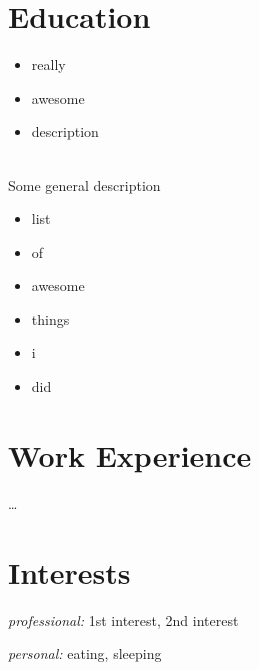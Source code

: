 \documentclass{scrcv}
\begin{document}
\section{Education}

\begin{description}[entrylist]
\item[01.2014--10.2014] 
  \begin{itemize}[itemizedentry]
  \item really 
  \item awesome
  \item description
  \end{itemize}
\item[04.2010--04.2013] \\
  Some general description
  \begin{itemize}[itemizedentry]
  \item list
  \item of
  \item awesome
  \item things
  \item i
  \item did
  \end{itemize}
\end{description}

\section{Work Experience}

\dots

\section{Interests}

\textit{professional:} 1st interest, 2nd interest

\textit{personal:} eating, sleeping

\end{document}
